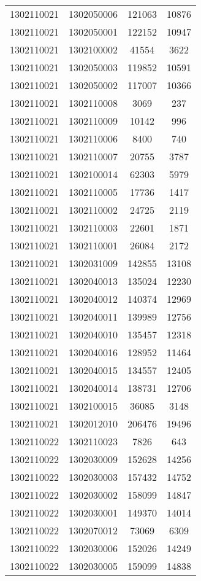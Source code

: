 \begin{longtable}{llcc}
1302110021 & 1302050006 & 121063 & 10876\\
1302110021 & 1302050001 & 122152 & 10947\\
1302110021 & 1302100002 & 41554 & 3622\\
1302110021 & 1302050003 & 119852 & 10591\\
1302110021 & 1302050002 & 117007 & 10366\\
1302110021 & 1302110008 & 3069 & 237\\
1302110021 & 1302110009 & 10142 & 996\\
1302110021 & 1302110006 & 8400 & 740\\
1302110021 & 1302110007 & 20755 & 3787\\
1302110021 & 1302100014 & 62303 & 5979\\
1302110021 & 1302110005 & 17736 & 1417\\
1302110021 & 1302110002 & 24725 & 2119\\
1302110021 & 1302110003 & 22601 & 1871\\
1302110021 & 1302110001 & 26084 & 2172\\
1302110021 & 1302031009 & 142855 & 13108\\
1302110021 & 1302040013 & 135024 & 12230\\
1302110021 & 1302040012 & 140374 & 12969\\
1302110021 & 1302040011 & 139989 & 12756\\
1302110021 & 1302040010 & 135457 & 12318\\
1302110021 & 1302040016 & 128952 & 11464\\
1302110021 & 1302040015 & 134557 & 12405\\
1302110021 & 1302040014 & 138731 & 12706\\
1302110021 & 1302100015 & 36085 & 3148\\
1302110021 & 1302012010 & 206476 & 19496\\
1302110022 & 1302110023 & 7826 & 643\\
1302110022 & 1302030009 & 152628 & 14256\\
1302110022 & 1302030003 & 157432 & 14752\\
1302110022 & 1302030002 & 158099 & 14847\\
1302110022 & 1302030001 & 149370 & 14014\\
1302110022 & 1302070012 & 73069 & 6309\\
1302110022 & 1302030006 & 152026 & 14249\\
1302110022 & 1302030005 & 159099 & 14838\\

\end{longtable}
